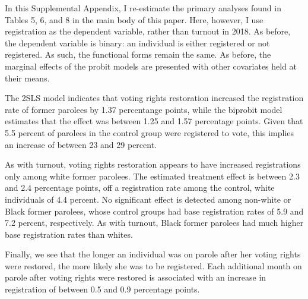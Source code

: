 \documentclass[
  12pt,
]{article}
\begin{document}
In this Supplemental Appendix, I re-estimate the primary analyses found in Tables 5, 6, and 8 in the main body of this paper. Here, however, I use registration as the dependent variable, rather than turnout in 2018. As before, the dependent variable is binary: an individual is either registered or not registered. As such, the functional forms remain the same. As before, the marginal effects of the probit models are presented with other covariates held at their means.

\begin{singlespace}

\end{singlespace}

The 2SLS model indicates that voting rights restoration increased the registration rate of former parolees by 1.37 percentange points, while the biprobit model estimates that the effect was between 1.25 and 1.57 percentage points. Given that 5.5 percent of parolees in the control group were registered to vote, this implies an increase of between 23 and 29 percent.

\begin{singlespace}

\end{singlespace}

As with turnout, voting rights restoration appears to have increased registrations only among white former parolees. The estimated treatment effect is between 2.3 and 2.4 percentage points, off a registration rate among the control, white individuals of 4.4 percent. No significant effect is detected among non-white or Black former parolees, whose control groups had base registration rates of 5.9 and 7.2 percent, respectively. As with turnout, Black former parolees had much higher base registration rates than whites.

\begin{singlespace}

\end{singlespace}

Finally, we see that the longer an individual was on parole after her voting rights were restored, the more likely she was to be registered. Each additional month on parole after voting rights were restored is associated with an increase in registration of between 0.5 and 0.9 percentage points.
\end{document}
